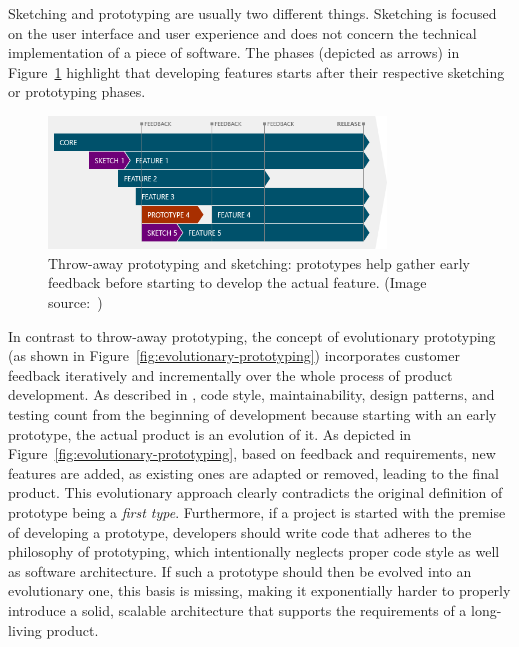 Sketching and prototyping are usually two different things.
Sketching is focused on the user interface and user experience and does not concern the technical implementation of a piece of software.
The phases (depicted as arrows) in Figure~\ref{fig:throw-away-prototyping} highlight that developing features starts after their respective sketching or prototyping phases.

\begin{figure}
    \centering
    \includegraphics[width=0.8\textwidth]{images/throw-away-prototyping}
    \caption{Throw-away prototyping and sketching: prototypes help gather early feedback before starting to develop the actual feature. (Image source:~\cite{mourzenko_why_2014})}
    \label{fig:throw-away-prototyping}
\end{figure}

In contrast to throw-away prototyping, the concept of evolutionary prototyping (as shown in Figure~\ref{fig:evolutionary-prototyping}) incorporates customer feedback iteratively and incrementally over the whole process of product development.
As described in \cite{mourzenko_why_2014}, code style, maintainability, design patterns, and testing count from the beginning of development because starting with an early prototype, the actual product is an evolution of it.
As depicted in Figure~\ref{fig:evolutionary-prototyping}, based on feedback and requirements, new features are added, as existing ones are adapted or removed, leading to the final product.
This evolutionary approach clearly contradicts the original definition of prototype being a \emph{first type}.
Furthermore, if a project is started with the premise of developing a prototype, developers should write code that adheres to the philosophy of prototyping, which intentionally neglects proper code style as well as software architecture.
If such a prototype should then be evolved into an evolutionary one, this basis is missing, making it exponentially harder to properly introduce a solid, scalable architecture that supports the requirements of a long-living product.

